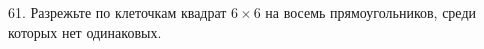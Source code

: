61. Разрежьте по клеточкам квадрат $6\times 6$ на восемь прямоугольников, среди которых нет одинаковых.\\

